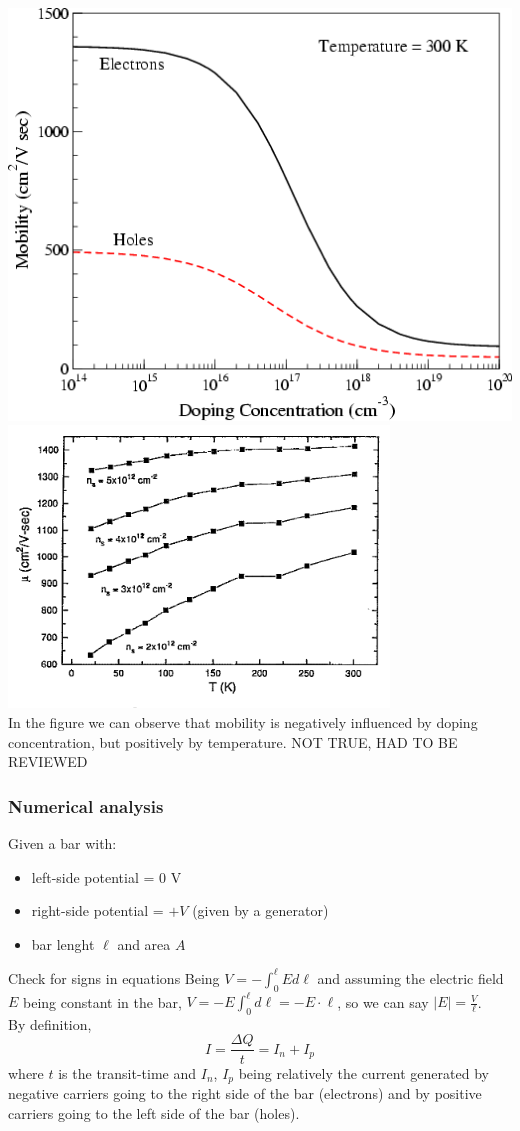 \documentclass[12pt]{article}
\begin{document}
\begin{center}
	\includegraphics[width=7 cm]{mob.png}
	\includegraphics[width=7 cm]{mobilityT} %
	\\
	In the figure we can observe that mobility is negatively influenced by doping  concentration, but positively by temperature.
	NOT TRUE, HAD TO BE REVIEWED 
\end{center}

\subsubsection{Numerical analysis}
Given a bar with:
\begin{itemize}
	\item left-side potential = 0 V
	\item right-side potential = $+V$ (given by a generator)
	\item bar lenght $\ell$ and area $A$
\end{itemize}
 Check for signs in equations
Being $V = -\int_{0}^{\ell}Ed\ell$ and assuming the electric field $E$ being constant in the bar, $V = -E\int_{0}^{\ell}d\ell = -E\cdot{\ell}$, so we can say $|E| = \frac{V}{\ell}$.\\
By definition,
\begin{equation}
I = \frac{\Delta Q}{t} = I_n + I_p
\end{equation} where $t$ is the transit-time and $I_n$, $I_p$ being relatively the current generated by negative carriers going to the right side of the bar (electrons) and by positive carriers going to the left side of the bar (holes). 
\end{document}
